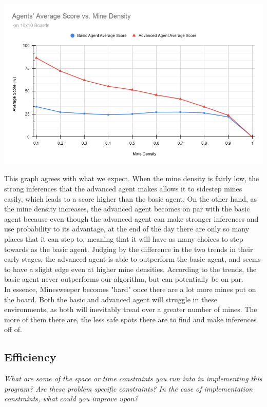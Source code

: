 \documentclass[11pt]{article} %
\begin{document}
\begin{center}
	\includegraphics*[scale=0.5]{plot.png}\\
\end{center}

This graph agrees with what we expect. When the mine density is fairly low, the strong inferences that the advanced agent makes allows it to sidestep mines easily, which leads to a score higher than the basic agent. On the other hand, as the mine density increases, the advanced agent becomes on par with the basic agent because even though the advanced agent can make stronger inferences and use probability to its advantage, at the end of the day there are only so many places that it can step to, meaning that it will have as many choices to step towards as the basic agent. Judging by the difference in the two trends in their early stages, the advanced agent is able to outperform the basic agent, and seems to have a slight edge even at higher mine densities. According to the trends, the basic agent never outperforms our algorithm, but can potentially be on par.\\

In essence, Minesweeper becomes "hard" once there are a lot more mines put on the board. Both the basic and advanced agent will struggle in these environments, as both will inevitably tread over a greater number of mines. The more of them there are, the less safe spots there are to find and make inferences off of.\\

\subsection{Efficiency}

\textit{What are some of the space or time constraints you run into in implementing this program? Are these problem specific constraints? In the case of implementation constraints, what could you improve upon?}\\
\end{document}
